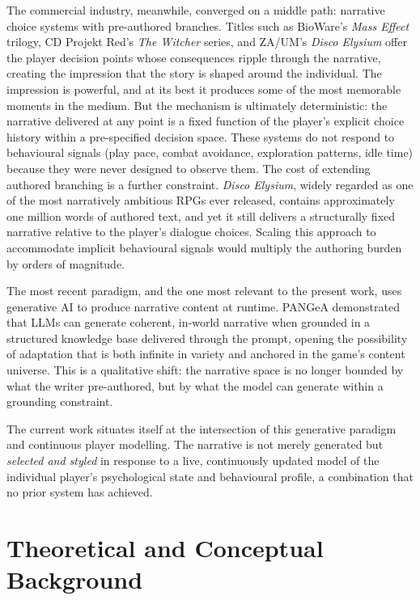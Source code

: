 The commercial industry, meanwhile, converged on a middle path: narrative choice systems with pre-authored branches. Titles such as BioWare's \textit{Mass Effect} trilogy, CD Projekt Red's \textit{The Witcher} series, and ZA/UM's \textit{Disco Elysium} offer the player decision points whose consequences ripple through the narrative, creating the impression that the story is shaped around the individual. The impression is powerful, and at its best it produces some of the most memorable moments in the medium. But the mechanism is ultimately deterministic: the narrative delivered at any point is a fixed function of the player's explicit choice history within a pre-specified decision space. These systems do not respond to behavioural signals (play pace, combat avoidance, exploration patterns, idle time) because they were never designed to observe them. The cost of extending authored branching is a further constraint. \textit{Disco Elysium}, widely regarded as one of the most narratively ambitious RPGs ever released, contains approximately one million words of authored text, and yet it still delivers a structurally fixed narrative relative to the player's dialogue choices. Scaling this approach to accommodate implicit behavioural signals would multiply the authoring burden by orders of magnitude.

The most recent paradigm, and the one most relevant to the present work, uses generative AI to produce narrative content at runtime. PANGeA \citep{todd2024pangea} demonstrated that LLMs can generate coherent, in-world narrative when grounded in a structured knowledge base delivered through the prompt, opening the possibility of adaptation that is both infinite in variety and anchored in the game's content universe. This is a qualitative shift: the narrative space is no longer bounded by what the writer pre-authored, but by what the model can generate within a grounding constraint.

The current work situates itself at the intersection of this generative paradigm and continuous player modelling. The narrative is not merely generated but \textit{selected and styled} in response to a live, continuously updated model of the individual player's psychological state and behavioural profile, a combination that no prior system has achieved.

\section{Theoretical and Conceptual Background}

